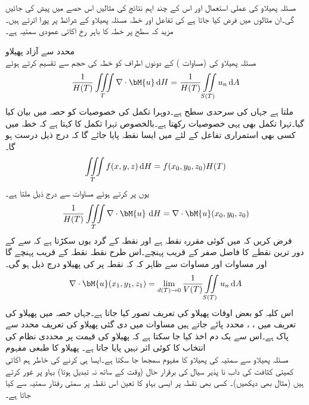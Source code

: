 مسئلہ پھیلاو کی عملی استعمال اور اس کے چند اہم نتائج کی مثالیں اس حصے میں پیش کی جائیں گی۔ان مثالوں میں فرض کیا جاتا ہے کی تفاعل اور خطہ  مسئلہ پھیلاو کے شرائط  پر پورا اترتے ہیں۔ مزید کہ سطح  پر خطہ  کا باہر رخ اکائی عمودی سمتیہ   ہے۔

\quad محدد سے آزاد پھیلاو\\
مسئلہ پھیلاو کی (مساوات ) کے دونوں اطراف کو خطہ  کی حجم  سے تقسیم کرتے ہوئے
\begin{align}\label{مساوات_خطی_تکمل_پھیلاو_مثال_الف}
\frac{1}{H(T)}\iiint\limits_T \nabla \cdot \bM{u}\dif H=\frac{1}{H(T)}\iint\limits_{S(T)}u_n \dif A
\end{align}
ملتا ہے جہاں  کی سرحدی سطح  ہے۔دوہرا تکمل کی خصوصیات کو حصہ  میں بیان کیا گیا۔تہرا تکمل بھی یہی خصوصیات رکھتا ہے۔بالخصوص تہرا تکمل کا  کہتا ہے کہ خطہ  میں کسی بھی استمراری تفاعل   کے لئے  میں ایسا نقطہ  پایا جائے گا کہ درج ذیل درست ہو گا۔
\begin{align*}
\iiint\limits_T f(x,y,z)\dif H=f(x_0,y_0,z_0) H(T)
\end{align*} 
یوں  پر کرتے ہوئے مساوات  سے درج ذیل ملتا ہے۔
\begin{align}\label{مساوات_خطی_تکمل_پھیلاو_مثال_ب}
\frac{1}{H(T)}\iiint\limits_T \nabla \cdot \bM{u}\, \dif H=\nabla \cdot \bM{u}(x_0,y_0,z_0)
\end{align}
فرض کریں کہ  میں  کوئی مقررہ نقطہ ہے اور  نقطہ  کے گرد یوں سکڑتا ہے کہ  سے  کے  دور ترین نقطے کا فاصل  صفر کے قریب پہنچے۔اس طرح نقطہ  نقطہ  کے قریب پہنچے گا اور مساوات  اور مساوات  سے ظاہر کہ کہ نقطہ  پر  کی پھیلاو درج ذیل ہو گی۔
\begin{align}\label{مساوات_خطی_تکمل_پھیلاو_مثال_پ}
\nabla \cdot \bM{u}(x_1,y_1,z_1)=\lim_{d(T)\to 0}\frac{1}{V(T)}\iint\limits_{S(T)}u_n\dif A
\end{align}
اس کلیہ کو بعض اوقات پھیلاو کی تعریف تصور کیا جاتا ہے۔جہاں حصہ  میں پھیلاو کی تعریف میں ، ،  محدد پائے جاتے ہیں مساوات  میں دی گئی پھیلاو کی تعریف محدد سے پاک ہے۔اس سے یک دم اخذ کیا جا سکتا ہے کہ پھیلاو کی قیمت پر محددی نظام کی انتخاب کا کوئی اثر نہیں پایا جاتا ہے۔
\quad پھیلاو کا طبعی مفہوم\\
مسئلہ پھیلاو سے سمتیہ کی پھیلاو کا مفہوم سمجھا جا سکتا ہے۔ایسا ہی کرنے کی خاطر ہم اکائی کمیتی کثافت  کی  داب نا پذیر  سیال کی برقرار حال (وقت کے ساتھ نہ تبدیل ہوتا) بہاو پر غور کرتے ہیں (مثال  بھی دیکھیں)۔ کسی بھی نقطہ  پر ایسی بہاو کا تعین اس نقطہ پر سمتی رفتار سمتیہ  سے کیا جاتا ہے۔


